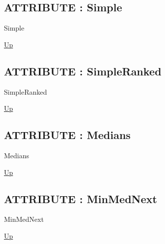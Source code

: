 \subsection*{ATTRIBUTE : Simple}
\hypertarget{ecldoc:ml_core.fieldaggregates.simple}{}
\begin{minipage}[t]{\textwidth}
\begin{flushleft}
 Simple 
\end{flushleft}
\end{minipage}
\hyperlink{ecldoc:ml_core.fieldaggregates}{Up}

\par
\par
\subsection*{ATTRIBUTE : SimpleRanked}
\hypertarget{ecldoc:ml_core.fieldaggregates.simpleranked}{}
\begin{minipage}[t]{\textwidth}
\begin{flushleft}
 SimpleRanked 
\end{flushleft}
\end{minipage}
\hyperlink{ecldoc:ml_core.fieldaggregates}{Up}

\par
\par
\subsection*{ATTRIBUTE : Medians}
\hypertarget{ecldoc:ml_core.fieldaggregates.medians}{}
\begin{minipage}[t]{\textwidth}
\begin{flushleft}
 Medians 
\end{flushleft}
\end{minipage}
\hyperlink{ecldoc:ml_core.fieldaggregates}{Up}

\par
\par
\subsection*{ATTRIBUTE : MinMedNext}
\hypertarget{ecldoc:ml_core.fieldaggregates.minmednext}{}
\begin{minipage}[t]{\textwidth}
\begin{flushleft}
 MinMedNext 
\end{flushleft}
\end{minipage}
\hyperlink{ecldoc:ml_core.fieldaggregates}{Up}


